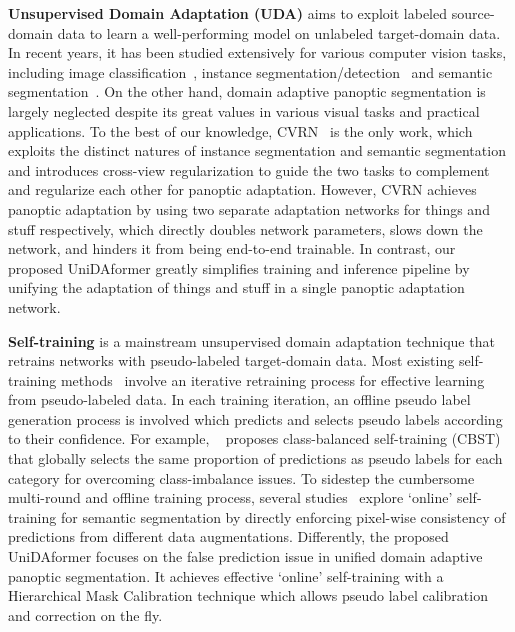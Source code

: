 \documentclass[10pt,twocolumn,letterpaper]{article}
\begin{document}
\textbf{Unsupervised Domain Adaptation (UDA)} aims to exploit labeled source-domain data to learn a well-performing model on unlabeled target-domain data. In recent years, it has been studied extensively for various computer vision tasks, including image classification~\cite{ganin2015grl,saito2018maximum,pinheiro2018unsupervised,saito2019semi,zou2019confidence,sankaranarayanan2018generate,long2017deep,pinheiro2018unsupervised,lu2020stochastic,du2021cross}, instance segmentation/detection~\cite{chen2018wild,inoue2018weakly,saito2019strong,xu2020category,cai2019mtor,li2020SAP,2020coarse2fine,guan2021uncertainty,huang2021fsdr,saha2021learning,zhang2022spectral} and semantic segmentation~\cite{zhang2019category,zou2019confidence,yang2020fda,huang2020contextual,zhang2021proda,li2019bidirectional_seg,kim2020learning,pan2020unsupervised,subhani2020learning,huang2021model,huang2022category,zhang2017curriculum}. On the other hand, domain adaptive panoptic segmentation is largely neglected despite its great values in various visual tasks and practical applications. To the best of our knowledge, CVRN~\cite{huang2021cvrn} is the only work, which exploits the distinct natures of instance segmentation and semantic segmentation and introduces cross-view regularization to guide the two tasks to complement and regularize each other for panoptic adaptation.
However, CVRN achieves panoptic adaptation by using two separate adaptation networks for things and stuff respectively, which directly doubles network parameters, slows down the network, and hinders it from being end-to-end trainable.
In contrast, our proposed UniDAformer greatly simplifies training and inference pipeline by unifying the adaptation of things and stuff in a single panoptic adaptation network.

\textbf{Self-training} is a mainstream unsupervised domain adaptation technique that retrains networks with pseudo-labeled target-domain data.
Most existing self-training methods~\cite{zou2018self_seg,inoue2018weakly,iqbal2020mlsl,yu2019self-training,kim2019self,zou2019confidence,vu2019advent,lian2019constructing,huang2021model,zhang2021proda} involve an iterative retraining process for effective learning from pseudo-labeled data. In each training iteration, an offline pseudo label generation process is involved which predicts and selects pseudo labels according to their confidence. For example, ~\cite{zou2018self_seg} proposes class-balanced self-training (CBST) that globally selects the same proportion of predictions as pseudo labels for each category for overcoming class-imbalance issues.
To sidestep the cumbersome multi-round and offline training process, several studies~\cite{melas2021pixmatch,araslanov2021self} explore `online' self-training for semantic segmentation by directly enforcing pixel-wise consistency of predictions from different data augmentations. 
Differently, the proposed UniDAformer focuses on the false prediction issue in unified domain adaptive panoptic segmentation. It achieves effective `online' self-training with a Hierarchical Mask Calibration technique which allows pseudo label calibration and correction on the fly.
\end{document}
